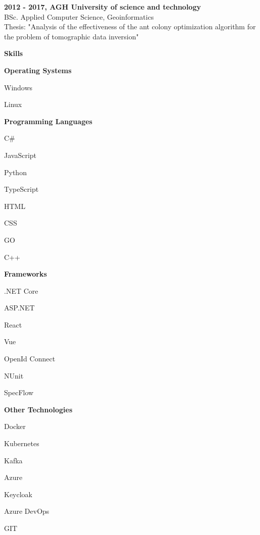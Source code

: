 \documentclass[a4paper,12pt,final]{memoir}
\newcommand{\Sep}{\vspace{1.5em}}
\newcommand{\SmallSep}{\vspace{0.5em}}
\newcommand{\CVSection}[1]
	{\Large\textbf{#1}\par
	\SmallSep\normalsize\normalfont}
\newcommand{\CVItem}[1]
	{\textbf{\color{RoyalBlue} #1}}
\begin{document}
\CVItem{2012 - 2017, AGH University of science and technology}\\
BSc. Applied Computer Science, Geoinformatics \\
Thesis: "Analysis of the effectiveness of the ant colony optimization algorithm for the problem of tomographic data inversion"
\SmallSep

\CVSection{Skills}
\CVItem{Operating Systems}
\begin{multicols}{3}
\begin{compactitem}[\color{RoyalBlue}$\circ$]
	\item Windows 
	\item Linux
\end{compactitem}
\end{multicols}
\SmallSep

\CVItem{Programming Languages}
\begin{multicols}{3}
\begin{compactitem}[\color{RoyalBlue}$\circ$]
	\item C\# 
	\item JavaScript 
	\item Python
	\item TypeScript
	\item HTML
	\item CSS
	\item GO
	\item C++
\end{compactitem}
\end{multicols}
\SmallSep

\CVItem{Frameworks}
\begin{multicols}{3}
\begin{compactitem}[\color{RoyalBlue}$\circ$]
	\item .NET Core
	\item ASP.NET
	\item React
	\item Vue
	\item OpenId Connect
	\item NUnit
	\item SpecFlow
\end{compactitem}
\end{multicols}
\SmallSep

\CVItem{Other Technologies}
\begin{multicols}{3}
\begin{compactitem}[\color{RoyalBlue}$\circ$]
	\item Docker
	\item Kubernetes
	\item Kafka
	\item Azure
	\item Keycloak
	\item Azure DevOps
	\item GIT
\end{compactitem}
\end{multicols}
\Sep 

\end{document}
